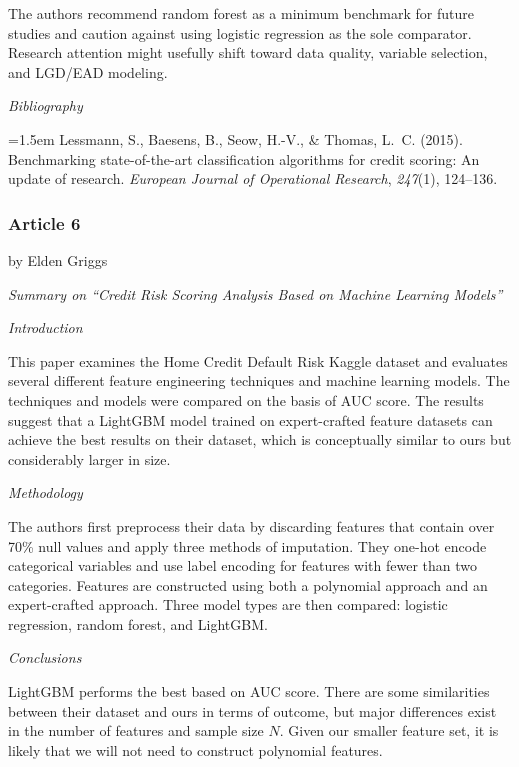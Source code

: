 \documentclass[letterpaper]{article}
\begin{document}
		The authors recommend random forest as a minimum benchmark for future studies and caution against using logistic regression as the sole comparator. Research attention might usefully shift toward data quality, variable selection, and LGD/EAD modeling.
		
		\medskip
		
		\textit{Bibliography}
		
		\hangindent=1.5em
		Lessmann, S., Baesens, B., Seow, H.-V., \& Thomas, L.~C. (2015). Benchmarking state-of-the-art classification algorithms for credit scoring: An update of research. \textit{European Journal of Operational Research}, \textit{247}(1), 124--136.
		
		
		\subsubsection{Article 6}
		
		{\color{deepred} by Elden Griggs}
		
		\textit{Summary on ``Credit Risk Scoring Analysis Based on Machine Learning Models''}
		
		
		\textit{Introduction}
		
		This paper examines the Home Credit Default Risk Kaggle dataset and evaluates several different feature engineering techniques and machine learning models. The techniques and models were compared on the basis of AUC score. The results suggest that a LightGBM model trained on expert-crafted feature datasets can achieve the best results on their dataset, which is conceptually similar to ours but considerably larger in size.
		
		\medskip
		
		\textit{Methodology}
		
		The authors first preprocess their data by discarding features that contain over 70\% null values and apply three methods of imputation. They one-hot encode categorical variables and use label encoding for features with fewer than two categories. Features are constructed using both a polynomial approach and an expert-crafted approach. Three model types are then compared: logistic regression, random forest, and LightGBM.
		
		\medskip
		
		\textit{Conclusions}
		
		LightGBM performs the best based on AUC score. There are some similarities between their dataset and ours in terms of outcome, but major differences exist in the number of features and sample size $N$. Given our smaller feature set, it is likely that we will not need to construct polynomial features.
		
\end{document}

